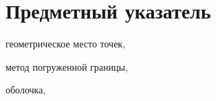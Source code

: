 \newpage

\section*{Предметный указатель}

геометрическое место точек, \pageref{term:gmt}

метод погруженной границы, \pageref{term:immersed_boundary_method}

оболочка, \pageref{term:envelope}
